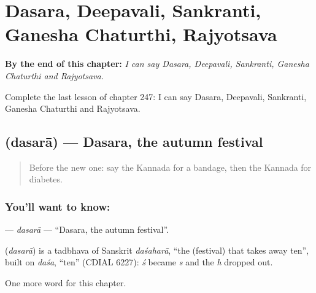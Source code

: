 
\chapter{Dasara, Deepavali, Sankranti, Ganesha Chaturthi, Rajyotsava}
\label{ch:ka-dasara-deepavali-sankranti-ganesha-chaturthi-rajyotsava}

\begin{chapteropening}
\textbf{By the end of this chapter:} \emph{I can say Dasara, Deepavali, Sankranti, Ganesha Chaturthi and Rajyotsava.}

Complete the last lesson of chapter 247: I can say Dasara, Deepavali, Sankranti, Ganesha Chaturthi and Rajyotsava.
\end{chapteropening}

\section[\texorpdfstring{\kn{ದಸರಾ} (dasarā)}{ದಸರಾ (dasarā)}]{ (dasarā) — Dasara, the autumn festival}

\label{lesson:KA-C247-dasara}



\begin{quote}
Before the new one: say the Kannada for a bandage, then the Kannada for diabetes.
\end{quote}

\subsection*{You'll want to know: }
\textbf{} — \emph{dasarā} — \textquotedblleft{}Dasara, the autumn festival\textquotedblright{}.

\begin{cousinweb}
\textbf{} (\emph{dasarā}) is a tadbhava of Sanskrit \emph{daśaharā}, \textquotedblleft{}the (festival) that takes away ten\textquotedblright{}, built on \emph{daśa}, \textquotedblleft{}ten\textquotedblright{} (CDIAL 6227): \emph{ś} became \emph{s} and the \emph{h} dropped out.
\end{cousinweb}

\begin{grammarlens}[title={What you've built}]
One more word for this chapter.
\end{grammarlens}

